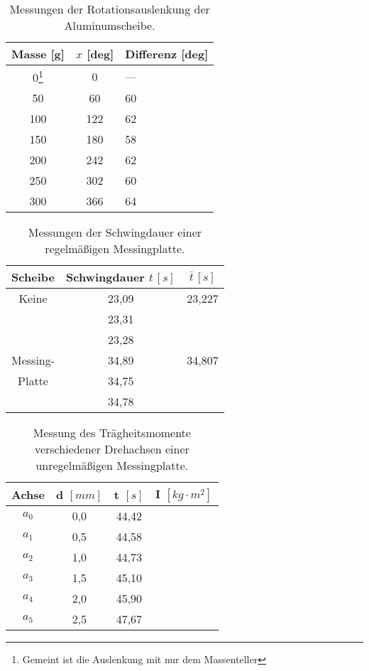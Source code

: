 \twocolumn

\begin{table}[h!]
    \begin{tabular}{c | c | l}
    Masse [g] & $x$ [deg] & Differenz [deg]\\
    \hline
    0\footnote{Gemeint ist die Auslenkung mit nur dem Massenteller}   & 0   & --- \\
    50  & 60  & 60 \\
    100 & 122 & 62 \\
    150 & 180 & 58 \\
    200 & 242 & 62 \\
    250 & 302 & 60 \\
    300 & 366 & 64 \\
    \hline
    \end{tabular}
    \caption{Messungen der Rotationsauslenkung der Aluminumscheibe.}
    \label{tab:verschiedene_massen_winkel_auslenkung}
\end{table}

\begin{table}[h!]
    \begin{tabular}{c | c | c}
    Scheibe & Schwingdauer $t \, [s]$ & $\bar{t} \, [s]$ \\
    \hline
    Keine       & 23,09 & 23,227\\
                & 23,31 &\\
                & 23,28 &\\
     \hline
    Messing-    & 34,89 & 34,807\\
    Platte      & 34,75 &\\
                & 34,78 &\\
    \hline
    \end{tabular}
    \caption{Messungen der Schwingdauer einer regelmäßigen Messingplatte.}
    \label{tab:regelmäßige_messingplatte}
\end{table}

\begin{table}[h!]
    \begin{tabular}{c | c | c | c}
    Achse & d $[mm]$ & t $[s]$ & I $[kg \cdot m^2]$ \\
    \hline
    $a_0$ & 0,0 & 44,42 & \\ 
    $a_1$ & 0,5 & 44,58 & \\
    $a_2$ & 1,0 & 44,73 & \\
    $a_3$ & 1,5 & 45,10 & \\
    $a_4$ & 2,0 & 45,90 & \\
    $a_5$ & 2,5 & 47,67 & \\
    \hline
    \end{tabular}
    \caption{Messung des Trägheitsmomente verschiedener Drehachsen einer unregelmäßigen Messingplatte.}
    \label{tab:unregelmäßige_messingplatte}
\end{table}
